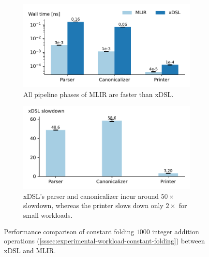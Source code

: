 \begin{figure}[H]
    \centering
    \begin{subfigure}[b]{0.45\textwidth}
        \includegraphics[width=\textwidth]{images/measuring_compiler_performance/walltimes.pdf}
        \caption{All pipeline phases of MLIR are faster than xDSL.}
        \vspace{1em}
        \label{fig:end-to-end-constant-folding-walltime}
    \end{subfigure}
    \hfill
    \begin{subfigure}[b]{0.45\textwidth}
        \includegraphics[width=\textwidth]{images/measuring_compiler_performance/speedup.pdf}
        \caption{xDSL's parser and canonicalizer incur around $50\times$ slowdown, whereas the printer slows down only $2\times$ for small workloads.}
        \label{fig:end-to-end-constant-folding-speedup}
    \end{subfigure}
    \caption{Performance comparison of constant folding $1000$ integer addition operations (\autoref{sssec:experimental-workload-constant-folding}) between xDSL and MLIR.}
    \label{fig:end-to-end-constant-folding}
\end{figure}


